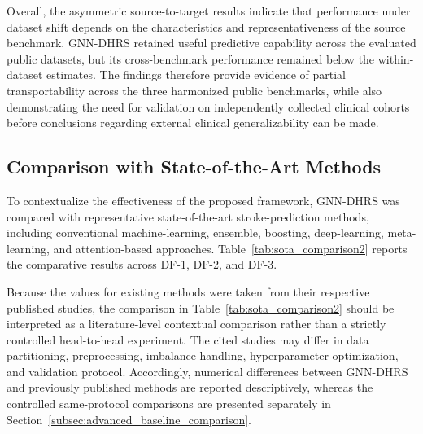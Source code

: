 \documentclass[pdflatex,sn-mathphys-num]{sn-jnl}%
\theoremstyle{thmstyleone}%
\theoremstyle{thmstyletwo}%
\theoremstyle{thmstylethree}%
\begin{document}
{
Overall, the asymmetric source-to-target results indicate that performance
under dataset shift depends on the characteristics and representativeness of
the source benchmark. GNN-DHRS retained useful predictive capability across
the evaluated public datasets, but its cross-benchmark performance remained
below the within-dataset estimates. The findings therefore provide evidence
of partial transportability across the three harmonized public benchmarks,
while also demonstrating the need for validation on independently collected
clinical cohorts before conclusions regarding external clinical
generalizability can be made.
}

\subsection{Comparison with State-of-the-Art Methods}
\label{subsec:sota_comparison}

To contextualize the effectiveness of the proposed framework, GNN-DHRS was
compared with representative state-of-the-art stroke-prediction methods,
including conventional machine-learning, ensemble, boosting, deep-learning,
meta-learning, and attention-based approaches.
Table~\ref{tab:sota_comparison2} reports the comparative results across
DF-1, DF-2, and DF-3.

 {
Because the values for existing methods were taken from their respective
published studies, the comparison in Table~\ref{tab:sota_comparison2} should
be interpreted as a literature-level contextual comparison rather than a
strictly controlled head-to-head experiment. The cited studies may differ in
data partitioning, preprocessing, imbalance handling, hyperparameter
optimization, and validation protocol. Accordingly, numerical differences
between GNN-DHRS and previously published methods are reported descriptively,
whereas the controlled same-protocol comparisons are presented separately in
Section~\ref{subsec:advanced_baseline_comparison}.
}
\end{document}
